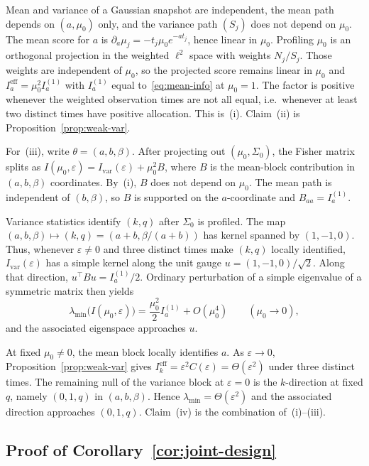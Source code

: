 \documentclass[anon,11pt]{alt2027}
\providecommand{\qed}{\hfill\BlackBox}
\begin{document}
Mean and variance of a Gaussian snapshot are independent, the mean path
depends on $(a,\mu_0)$ only, and the variance path $(S_j)$ does not depend on
$\mu_0$. The mean score for $a$ is $\partial_a\mu_j=-t_j\mu_0 e^{-at_j}$, hence
linear in $\mu_0$. Profiling $\mu_0$ is an orthogonal projection in the
weighted $\ell^2$ space with weights $N_j/S_j$. Those weights are independent
of $\mu_0$, so the projected score remains linear in $\mu_0$ and
$I_a^{\mathrm{eff}}=\mu_0^2 I_a^{(1)}$ with $I_a^{(1)}$ equal
to~\eqref{eq:mean-info} at $\mu_0=1$. The factor is positive whenever the
weighted observation times are not all equal, i.e.\ whenever at least two
distinct times have positive allocation. This is~(i). Claim~(ii) is
Proposition~\ref{prop:weak-var}.

For~(iii), write $\theta=(a,b,\beta)$. After projecting out
$(\mu_0,\Sigma_0)$, the Fisher matrix splits as
$I(\mu_0,\varepsilon)=I_{\mathrm{var}}(\varepsilon)+\mu_0^2 B$, where $B$ is
the mean-block contribution in $(a,b,\beta)$ coordinates. By~(i), $B$ does
not depend on $\mu_0$. The mean path is independent of $(b,\beta)$, so $B$
is supported on the $a$-coordinate and $B_{aa}=I_a^{(1)}$.

Variance statistics identify $(k,q)$ after $\Sigma_0$ is profiled. The map
$(a,b,\beta)\mapsto(k,q)=(a+b,\beta/(a+b))$ has kernel spanned by
$(1,-1,0)$. Thus, whenever $\varepsilon\neq 0$ and three distinct times make
$(k,q)$ locally identified, $I_{\mathrm{var}}(\varepsilon)$ has a simple
kernel along the unit gauge $u=(1,-1,0)/\sqrt{2}$. Along that direction,
$u^\top B u=I_a^{(1)}/2$. Ordinary perturbation of a simple eigenvalue of a
symmetric matrix then yields
\[
\lambda_{\min}\bigl(I(\mu_0,\varepsilon)\bigr)
=
\frac{\mu_0^2}{2}I_a^{(1)}+O(\mu_0^4)
\qquad(\mu_0\to 0),
\]
and the associated eigenspace approaches $u$.

At fixed $\mu_0\neq 0$, the mean block locally identifies $a$. As
$\varepsilon\to 0$, Proposition~\ref{prop:weak-var} gives
$I_k^{\mathrm{eff}}=\varepsilon^2 C(\varepsilon)=\Theta(\varepsilon^2)$ under
three distinct times. The remaining null of the variance block at
$\varepsilon=0$ is the $k$-direction at fixed $q$, namely $(0,1,q)$ in
$(a,b,\beta)$. Hence $\lambda_{\min}=\Theta(\varepsilon^2)$ and the associated
direction approaches $(0,1,q)$. Claim~(iv) is the combination of~(i)--(iii).\qed

\subsection{Proof of Corollary~\ref{cor:joint-design}}
\end{document}
